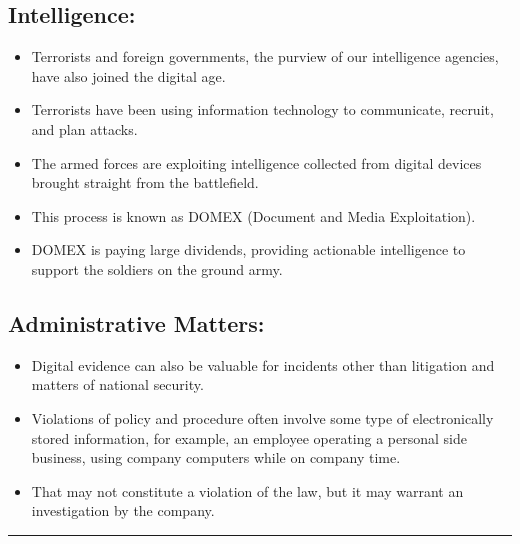 \documentclass[british]{article}
\begin{document}
\subsection{Intelligence:}
\begin{itemize}
\item Terrorists and foreign governments, the purview of our intelligence
agencies, have also joined the digital age. 
\item Terrorists have been using information technology to communicate,
recruit, and plan attacks. 
\item The armed forces are exploiting intelligence collected from digital
devices brought straight from the battlefield. 
\item This process is known as DOMEX (Document and Media Exploitation). 
\item DOMEX is paying large dividends, providing actionable intelligence
to support the soldiers on the ground army. 
\end{itemize}

\subsection{Administrative Matters:}
\begin{itemize}
\item Digital evidence can also be valuable for incidents other than litigation
and matters of national security. 
\item Violations of policy and procedure often involve some type of electronically
stored information, for example, an employee operating a personal
side business, using company computers while on company time. 
\item That may not constitute a violation of the law, but it may warrant
an investigation by the company. 
\end{itemize}
\rule[0.5ex]{0.75\columnwidth}{1pt}

\vfill{}
\end{document}

